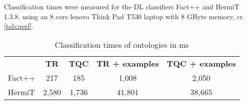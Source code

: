 Classification times were measured for the DL classifiers Fact++ and HermiT 1.3.8. using an 8 core lenovo Think Pad T530 laptop with 
8 GByte memory, cr. \ref{tab:perf}.


\begin{table}
\caption{Classification times of ontologies in ms}
\label{tab:perf}
\centering
\begin{tabular}{ l c c c c }
\hline
 &  {\bf TR} & {\bf TQC} & {\bf TR + examples} & {\bf TQC + examples} \\
Fact++	 & 217	& 185	& 1,008 & 2,050 \\
HermiT & 2,580 & 1,736 & 41,801 & 38,665\\ 
\end{tabular}
\label{tab:cases}
\end{table}


  
  
